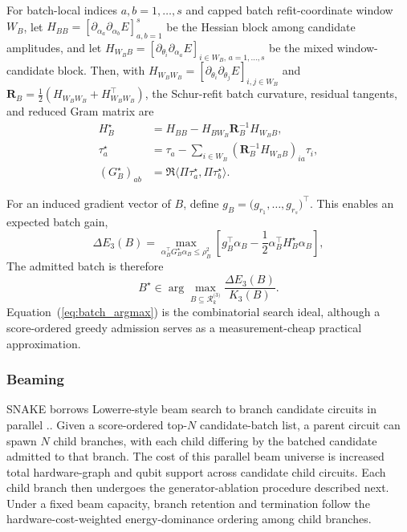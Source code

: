 \documentclass[
  reprint,
  amsmath,
  amssymb,
  aps,
  pra,
  nofootinbib,
  superscriptaddress,
  floatfix
]{revtex4-2}
\begin{document}
For batch-local indices \(a,b=1,\ldots,s\) and capped batch refit-coordinate window \(W_B\), let $H_{BB}=[\partial_{\alpha_a}\partial_{\alpha_b}E]_{a,b=1}^s$ be the Hessian block among candidate amplitudes, and let $H_{W_BB}=[\partial_{\theta_i}\partial_{\alpha_a}E]_{i\in W_B,\,a=1,\ldots,s}$ be the mixed window-candidate block. Then, with $H_{W_BW_B}=[\partial_{\theta_i}\partial_{\theta_j}E]_{i,j\in W_B}$ and $\mathbf R_B=\frac12(H_{W_BW_B}+H_{W_BW_B}^{\top})$, the Schur-refit batch curvature, residual tangents, and reduced Gram matrix are
\begin{equation}
\begin{aligned}
H_B^\star
&=
H_{BB}
-
H_{BW_B}\mathbf R_B^{-1}H_{W_BB},\\
\tau_a^\star
&=\tau_a-\sum_{i\in W_B}(\mathbf R_B^{-1}H_{W_BB})_{ia}\tau_i,\\
(G_B^\star)_{ab}
&=\Re\langle \Pi\tau_a^\star,\Pi\tau_b^\star\rangle .
\end{aligned}
\label{eq:batch_schur_curvature}
\end{equation}

For an induced gradient vector of $B$, define \(g_B=\big(g_{r_1},\ldots,g_{r_s}\big)^\top\). This enables an expected batch gain,
\begin{equation}
\Delta E_3(B)
=
\max_{\alpha_B^\top G_B^\star\alpha_B\le \rho_B^2}
\left[
g_B^\top\alpha_B
-
\frac12\alpha_B^\top H_B^\star\alpha_B
\right],
\label{eq:batch_expected_gain}
\end{equation}
The admitted batch is therefore
\begin{equation}
B^\star\in\arg\max_{B\subseteq\mathcal R_k^{({3)}}}\frac{\Delta E_3(B)}{K_3(B)}.
\label{eq:batch_argmax}
\end{equation}
Equation~(\ref{eq:batch_argmax}) is the combinatorial search ideal, although a score-ordered greedy admission serves as a measurement-cheap practical approximation. 

\subsubsection{Beaming}
\textsc{SNAKE} borrows Lowerre-style beam search to branch candidate circuits in parallel \cite{Lowerre1976Beam}.. Given a score-ordered top-$N$ candidate-batch list, a parent circuit can spawn $N$ child branches, with each child differing by the batched candidate admitted to that branch. The cost of this parallel beam universe is increased total hardware-graph and qubit support across candidate child circuits. Each child branch then undergoes the generator-ablation procedure described next. Under a fixed beam capacity, branch retention and termination follow the hardware-cost-weighted energy-dominance ordering among child branches.
\end{document}
